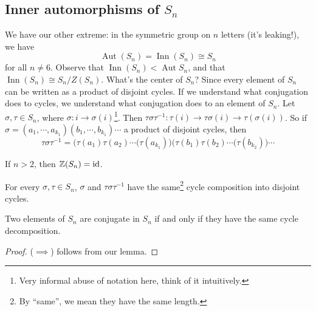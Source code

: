 \subsection{Inner automorphisms of $S_n$}
\begin{example}
    We have our other extreme: in the symmetric group on $n$ letters (it's leaking!), we have \[
        \operatorname{Aut}(S_n)=\operatorname{Inn}(S_n)\cong S_n
    \] for all $n\neq 6$. Observe that $\operatorname{Inn}(S_n) < \operatorname{Aut}S_n$, and that $\operatorname{Inn}(S_n)\cong S_n / Z(S_n)$. What's the center of $S_n$? Since every element of $S_n$ can be written as a product of disjoint cycles. If we understand what conjugation does to cycles, we understand what conjugation does to an element of $S_n$. Let $\sigma, \tau \in S_n$, where $\sigma \colon i \to \sigma(i)$\footnote{Very informal abuse of notation here, think of it intuitively.}. Then $\tau\sigma\tau^{-1} \colon \tau(i) \to \tau\sigma(i) \to \tau(\sigma(i))$. So if $\sigma = (a_1,\cdots,a_{k_1})(b_1,\cdots,b_{k_1})\cdots$ a product of disjoint cycles, then \[
    \tau\sigma\tau^{-1}=\big(\tau(a_1)\tau(a_2)\cdots(\tau(a_{k_1})\big)\big(\tau(b_1)\tau(b_2)\cdots(\tau(b_{k_2})\big)\cdots
    \] 
    \begin{lemma}
        If $n>2$, then $\mathbb{Z}(S_n)=\operatorname{id}$. 
    \end{lemma}
    \begin{lemma}
        For every $\sigma,\tau \in S_n$, $\sigma$ and $\tau\sigma\tau^{-1}$ have the same\footnote{By ``same'', we mean they have the same length.} cycle composition into disjoint cycles.
    \end{lemma}
   \begin{prop}
       Two elements of $S_n$ are conjugate in $S_n$ if and only if they have the same cycle decomposition.
   \end{prop}
   \begin{proof}
       ($\implies $) follows from our lemma.


\end{proof}
\end{example}
